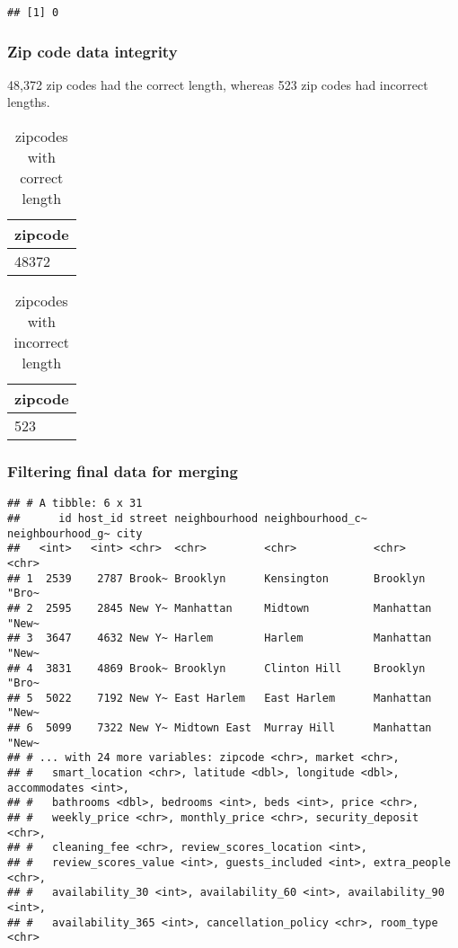 \documentclass[
]{article}
\begin{document}
\begin{verbatim}
## [1] 0
\end{verbatim}

\hypertarget{zip-code-data-integrity}{%
\subsubsection{Zip code data integrity}\label{zip-code-data-integrity}}

48,372 zip codes had the correct length, whereas 523 zip codes had
incorrect lengths.

\begin{table}

\caption{\label{tab:zipcode_integrity}zipcodes with correct length}
\centering
\begin{tabular}[t]{l}
\hline
zipcode\\
\hline
48372\\
\hline
\end{tabular}
\end{table}

\begin{table}

\caption{\label{tab:zipcode_integrity}zipcodes with incorrect length}
\centering
\begin{tabular}[t]{l}
\hline
zipcode\\
\hline
523\\
\hline
\end{tabular}
\end{table}

\hypertarget{filtering-final-data-for-merging-1}{%
\subsubsection{Filtering final data for
merging}\label{filtering-final-data-for-merging-1}}

\begin{verbatim}
## # A tibble: 6 x 31
##      id host_id street neighbourhood neighbourhood_c~ neighbourhood_g~ city 
##   <int>   <int> <chr>  <chr>         <chr>            <chr>            <chr>
## 1  2539    2787 Brook~ Brooklyn      Kensington       Brooklyn         "Bro~
## 2  2595    2845 New Y~ Manhattan     Midtown          Manhattan        "New~
## 3  3647    4632 New Y~ Harlem        Harlem           Manhattan        "New~
## 4  3831    4869 Brook~ Brooklyn      Clinton Hill     Brooklyn         "Bro~
## 5  5022    7192 New Y~ East Harlem   East Harlem      Manhattan        "New~
## 6  5099    7322 New Y~ Midtown East  Murray Hill      Manhattan        "New~
## # ... with 24 more variables: zipcode <chr>, market <chr>,
## #   smart_location <chr>, latitude <dbl>, longitude <dbl>, accommodates <int>,
## #   bathrooms <dbl>, bedrooms <int>, beds <int>, price <chr>,
## #   weekly_price <chr>, monthly_price <chr>, security_deposit <chr>,
## #   cleaning_fee <chr>, review_scores_location <int>,
## #   review_scores_value <int>, guests_included <int>, extra_people <chr>,
## #   availability_30 <int>, availability_60 <int>, availability_90 <int>,
## #   availability_365 <int>, cancellation_policy <chr>, room_type <chr>
\end{verbatim}
\end{document}
